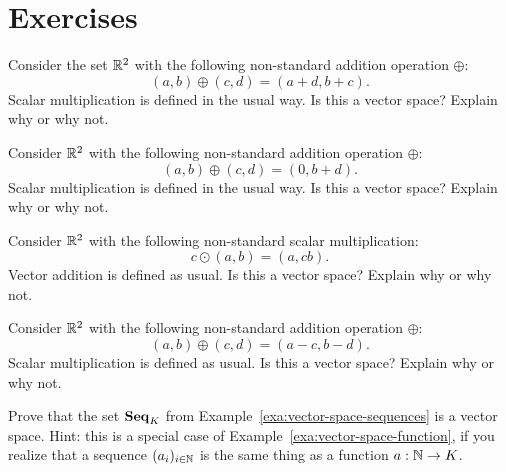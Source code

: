 \section*{Exercises}

\begin{ex}
  Consider the set $\mathbb{R}^2$ with the following non-standard addition
  operation $\oplus$:
  \begin{equation*}
    (a,b) \oplus (c,d) = (a+d,b+c).
  \end{equation*}
  Scalar multiplication is defined in the usual way. Is this a vector space?
  Explain why or why not.
\end{ex}

\begin{ex}
  Consider $\mathbb{R}^{2}$ with the following non-standard addition operation
  $\oplus$:
  \begin{equation*}
    (a,b) \oplus (c,d) = (0,b+d).
  \end{equation*}
  Scalar multiplication is defined in the usual way. Is this a vector space?
  Explain why or why not.
\end{ex}

\begin{ex}
  Consider $\mathbb{R}^{2}$ with the following non-standard scalar multiplication:
  \begin{equation*}
    c\odot(a,b) = (a,cb).
  \end{equation*}
  Vector addition is defined as usual. Is this a vector space? Explain
  why or why not.
\end{ex}

\begin{ex}
  Consider $\mathbb{R}^{2}$ with the following non-standard addition operation
  $\oplus$:
  \begin{equation*}
    (a,b) \oplus (c,d) = (a-c,b-d).
  \end{equation*}
  Scalar multiplication is defined as usual. Is this a vector space?
  Explain why or why not.
\end{ex}

\begin{ex}
  Prove that the set $\mathbf{Seq}_K$ from
  Example~\ref{exa:vector-space-sequences} is a vector space.
  Hint: this is a special case of
  Example~\ref{exa:vector-space-function}, if you realize that a
  sequence $(a_i)_{i\in\mathbb{N}}$ is the same thing as a function $a:\mathbb{N}\to K$.
\end{ex}

